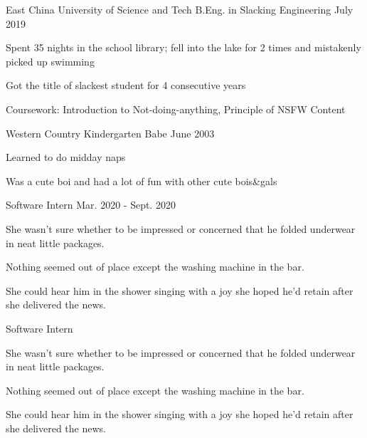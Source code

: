 \documentclass[12pt, a4paper]{yp-vita}
\begin{document}
    \makename
    \makecontact{\myemail}{\mymobile}{\mygithub}{\mylinkedin}

    \medskip


    \mentry
        {East China University of Science and Tech}
        {B.Eng. in Slacking Engineering}
        {July 2019}
        {
            \begin{cvitems} %
              \item {Spent 35 nights in the school library; fell into the lake for 2 times and mistakenly picked up swimming}
              \item {Got the title of slackest student for 4 consecutive years}
              \item {Coursework: Introduction to Not-doing-anything, Principle of NSFW Content}
            \end{cvitems}
          }
    
    \smallskip

    \mentry
        {Western Country Kindergarten}
        {Babe}
        {June 2003}
        {
            \begin{cvitems} %
                \item {Learned to do midday naps}
                \item {Was a cute boi and had a lot of fun with other cute bois\&gals}
            \end{cvitems}
        }
    
    

    {Software Intern}
    {Mar. 2020 - Sept. 2020}
    {
        \begin{cvitems}
            \item {She wasn't sure whether to be impressed or concerned that he folded underwear in neat little packages.}
            \item {Nothing seemed out of place except the washing machine in the bar.}
            \item {She could hear him in the shower singing with a joy she hoped he'd retain after she delivered the news.}
        \end{cvitems}
    }
    



    {Software Intern}
    {}
    {
        \begin{cvitems}
            \item {She wasn't sure whether to be impressed or concerned that he folded underwear in neat little packages.}
            \item {Nothing seemed out of place except the washing machine in the bar.}
            \item {She could hear him in the shower singing with a joy she hoped he'd retain after she delivered the news.}
        \end{cvitems}
    }
\end{document}
